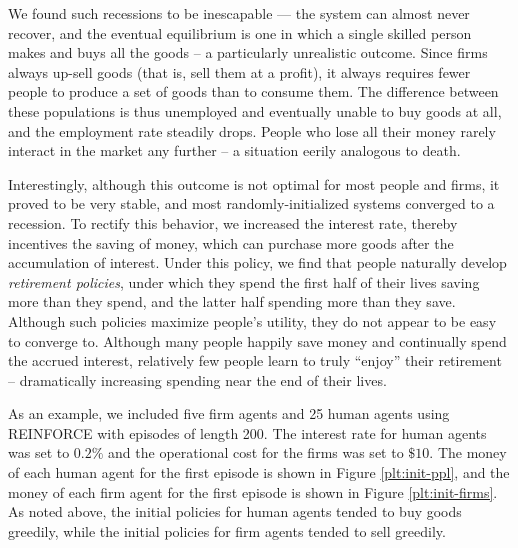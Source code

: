 \documentclass[twoside,twocolumn]{article}
\begin{document}
We found such recessions to be inescapable — the system can almost never recover, and the eventual equilibrium is one in which a single skilled person makes and buys all the goods -- a particularly unrealistic outcome. Since firms always up-sell goods (that is, sell them at a profit), it always requires fewer people to produce a set of goods than to consume them. The difference between these populations is thus unemployed and eventually unable to buy goods at all, and the employment rate steadily drops. People who lose all their money rarely interact in the market any further -- a situation eerily analogous to death.

Interestingly, although this outcome is not optimal for most people and firms, it proved to be very stable, and most randomly-initialized systems converged to a recession. To rectify this behavior, we increased the interest rate, thereby incentives the saving of money, which can purchase more goods after the accumulation of interest. Under this policy, we find that people naturally develop \textit{retirement policies}, under which they spend the first half of their lives saving more than they spend, and the latter half spending more than they save. Although such policies maximize people’s utility, they do not appear to be easy to converge to. Although many people happily save money and continually spend the accrued interest, relatively few people learn to truly ``enjoy'' their retirement -- dramatically increasing spending near the end of their lives.

As an example, we included five firm agents and 25 human agents using REINFORCE with episodes of length 200. The interest rate for human agents was set to $0.2\%$ and the operational cost for the firms was set to $\$10$. The money of each human agent for the first episode is shown in Figure \ref{plt:init-ppl}, and the money of each firm agent for the first episode is shown in Figure \ref{plt:init-firms}. As noted above, the initial policies for human agents tended to buy goods greedily, while the initial policies for firm agents tended to sell greedily.
\end{document}
